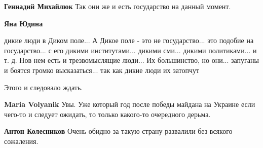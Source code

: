 \begin{itemize}
\begin{itemize}
 
\textbf{Геннадий Михайлюк} Так они же и есть государство на данный момент.

 
\textbf{Яна Юдина} 

дикие люди в Диком поле... А Дикое поле - это не
государство... это подобие на государство... с его дикими институтами... дикими
сми... дикими политиками... и т. д. Нов нем есть и трезвомыслящие люди... Их
большинство, но они... запуганы и боятся громко высказаться... так как дикие
люди их затопчут
\end{itemize}

 
Этого и следовало ждать.

\begin{itemize}
 
\textbf{Maria Volyanik} Увы. Уже который год после победы майдана на Украине если чего-то и следует ожидать, то только какого-то очередного дерьма.

 
\textbf{Антон Колесников} Очень обидно за такую страну развалили без всякого сожаления.
\end{itemize}

 

\end{itemize}
